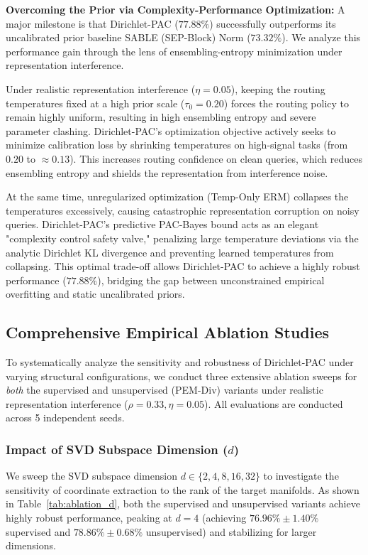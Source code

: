 \textbf{Overcoming the Prior via Complexity-Performance Optimization:}
A major milestone is that Dirichlet-PAC ($77.88\%$) successfully outperforms its uncalibrated prior baseline SABLE (SEP-Block) Norm ($73.32\%$). We analyze this performance gain through the lens of ensembling-entropy minimization under representation interference.

Under realistic representation interference ($\eta = 0.05$), keeping the routing temperatures fixed at a high prior scale ($\tau_0 = 0.20$) forces the routing policy to remain highly uniform, resulting in high ensembling entropy and severe parameter clashing. Dirichlet-PAC's optimization objective actively seeks to minimize calibration loss by shrinking temperatures on high-signal tasks (from $0.20$ to $\approx 0.13$). This increases routing confidence on clean queries, which reduces ensembling entropy and shields the representation from interference noise. 

At the same time, unregularized optimization (Temp-Only ERM) collapses the temperatures excessively, causing catastrophic representation corruption on noisy queries. Dirichlet-PAC's predictive PAC-Bayes bound acts as an elegant "complexity control safety valve," penalizing large temperature deviations via the analytic Dirichlet KL divergence and preventing learned temperatures from collapsing. This optimal trade-off allows Dirichlet-PAC to achieve a highly robust performance ($77.88\%$), bridging the gap between unconstrained empirical overfitting and static uncalibrated priors.

\subsection{Comprehensive Empirical Ablation Studies}
To systematically analyze the sensitivity and robustness of Dirichlet-PAC under varying structural configurations, we conduct three extensive ablation sweeps for \emph{both} the supervised and unsupervised (PEM-Div) variants under realistic representation interference ($\rho = 0.33, \eta = 0.05$). All evaluations are conducted across 5 independent seeds.

\subsubsection{Impact of SVD Subspace Dimension ($d$)}
We sweep the SVD subspace dimension $d \in \{2, 4, 8, 16, 32\}$ to investigate the sensitivity of coordinate extraction to the rank of the target manifolds. As shown in Table~\ref{tab:ablation_d}, both the supervised and unsupervised variants achieve highly robust performance, peaking at $d=4$ (achieving $76.96\% \pm 1.40\%$ supervised and $78.86\% \pm 0.68\%$ unsupervised) and stabilizing for larger dimensions. 

